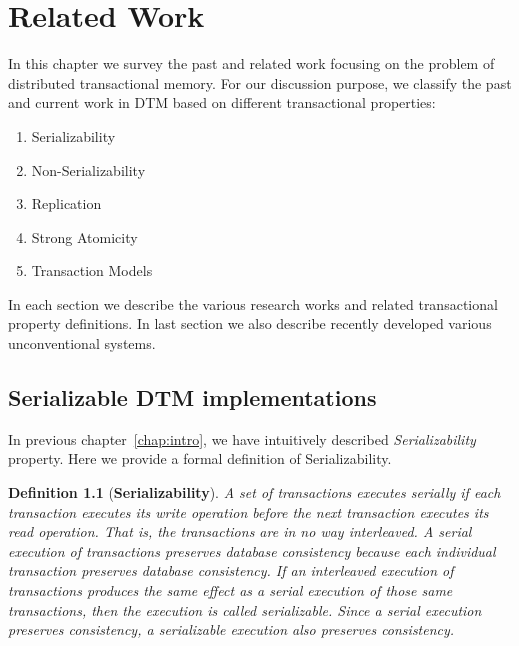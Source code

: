 \documentclass[12pt,english]{report}
\newtheorem{definition}{Definition}[section]
\begin{document}
\chapter{Related Work}\label{chap:relWork}

In this chapter we survey the past and related work focusing on the problem of distributed transactional memory. For our discussion purpose, we classify the past and current work in DTM based on different transactional properties:

\begin{enumerate}
\item Serializability
\item Non-Serializability 
\item Replication 
\item Strong Atomicity
\item Transaction Models
\end{enumerate}

In each section we describe the various research works and related transactional property definitions. In last section we also describe recently developed various unconventional systems.

\section{Serializable DTM implementations}

In previous chapter~\ref{chap:intro}, we have intuitively described \textit{Serializability} property. Here we provide a formal definition of Serializability. 

\begin{definition}[\textbf{Serializability}]
A set of transactions executes serially if each transaction executes its write operation before the next transaction executes its read operation. That is, the transactions are in no way interleaved. A serial execution of transactions preserves database consistency because each individual transaction preserves
database consistency. If an interleaved execution of transactions produces the same effect as a serial execution of those same transactions, then the execution is called serializable. Since a serial execution preserves consistency, a serializable execution also preserves consistency.~\cite{serializabilityFormal}
\end{definition}
\end{document}
